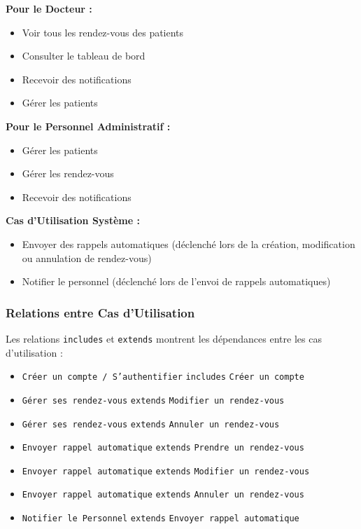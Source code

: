\documentclass[12pt,a4paper]{report}
\begin{document}
\textbf{Pour le Docteur :}
\begin{itemize}
    \item Voir tous les rendez-vous des patients
    \item Consulter le tableau de bord
    \item Recevoir des notifications
    \item Gérer les patients
\end{itemize}

\textbf{Pour le Personnel Administratif :}
\begin{itemize}
    \item Gérer les patients
    \item Gérer les rendez-vous
    \item Recevoir des notifications
\end{itemize}

\textbf{Cas d'Utilisation Système :}
\begin{itemize}
    \item Envoyer des rappels automatiques (déclenché lors de la création, modification ou annulation de rendez-vous)
    \item Notifier le personnel (déclenché lors de l'envoi de rappels automatiques)
\end{itemize}

\subsubsection{Relations entre Cas d'Utilisation}

Les relations \texttt{includes} et \texttt{extends} montrent les dépendances entre les cas d'utilisation :
\begin{itemize}
    \item \texttt{Créer un compte / S'authentifier} \texttt{includes} \texttt{Créer un compte}
    \item \texttt{Gérer ses rendez-vous} \texttt{extends} \texttt{Modifier un rendez-vous}
    \item \texttt{Gérer ses rendez-vous} \texttt{extends} \texttt{Annuler un rendez-vous}
    \item \texttt{Envoyer rappel automatique} \texttt{extends} \texttt{Prendre un rendez-vous}
    \item \texttt{Envoyer rappel automatique} \texttt{extends} \texttt{Modifier un rendez-vous}
    \item \texttt{Envoyer rappel automatique} \texttt{extends} \texttt{Annuler un rendez-vous}
    \item \texttt{Notifier le Personnel} \texttt{extends} \texttt{Envoyer rappel automatique}
\end{itemize}
\end{document}

